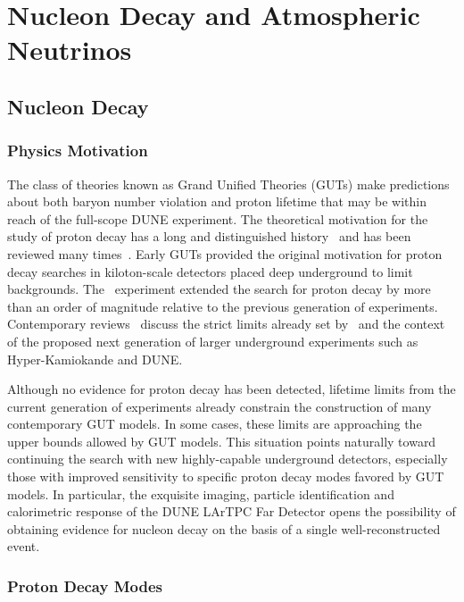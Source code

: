 \chapter{Nucleon Decay and Atmospheric Neutrinos}
\label{ch:physics-atmpdk}

\section{Nucleon Decay}
\label{sec:physics-atmpdk-ndk}

\subsection{Physics Motivation}
The class of theories known as Grand Unified Theories (GUTs) make
predictions about both baryon number violation and proton lifetime
that may be within reach of the full-scope DUNE experiment.
%
The theoretical motivation for the study of proton decay has a long and
distinguished history~\cite{Pati:1973rp,Georgi:1974sy,Dimopoulos:1981dw} and
has been reviewed many times~\cite{Langacker:1980js,deBoer:1994dg,Nath:2006ut}.
%
Early GUTs provided the original motivation for proton decay searches in
kiloton-scale detectors placed deep underground to limit backgrounds.  The
 \superk\ experiment extended the search for proton decay by more
than an order of magnitude relative to the previous generation of experiments.
%
Contemporary reviews~\cite{Raby:2008pd,Senjanovic:2009kr,Li:2010dp} discuss the
strict limits already set by \superk\ and the context of the proposed next
generation of larger underground
experiments such as Hyper-Kamiokande and DUNE.

Although no evidence for proton decay has been detected, lifetime
limits from the current generation of experiments already constrain
the construction of many contemporary GUT models. 
In some cases, these limits are approaching the upper bounds allowed 
by GUT models.  This situation points naturally toward continuing 
the search with new highly-capable underground detectors, especially those 
with improved sensitivity to specific proton decay modes favored by GUT models.
In particular, the exquisite imaging, particle identification and calorimetric 
response of the DUNE LArTPC Far Detector opens the possibility of obtaining 
evidence for nucleon decay on the basis of a single well-reconstructed event.

\subsection{Proton Decay Modes} 

